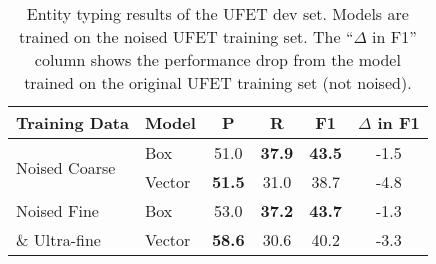 \documentclass[11pt,a4paper]{article}
\begin{document}
\renewcommand{\arraystretch}{1}
\begin{table}[t]
	\centering
	\small
	\setlength{\tabcolsep}{4pt}
	\begin{tabular}{l l c  c  c  c}
		\toprule
		\multicolumn{1}{c}{Training Data} & \multicolumn{1}{c}{Model}& \multicolumn{1}{c}{P} & \multicolumn{1}{c}{R} & \multicolumn{1}{c}{F1}  & \multicolumn{1}{c}{$\Delta$ in F1} \\
		\midrule
		 \multirow{2}{*}{Noised Coarse} & Box & 51.0 & \textbf{37.9} & \textbf{43.5} & -1.5 \\
		 & Vector & \textbf{51.5} & 31.0 & 38.7 & -4.8\\
		 \midrule
		 Noised Fine & Box & 53.0 & \textbf{37.2} & \textbf{43.7} & -1.3 \\
		 \:\:\:\:\& Ultra-fine& Vector & \textbf{58.6} & 30.6 & 40.2 & -3.3\\
		\bottomrule 
	\end{tabular}
	\caption{Entity typing results of the UFET dev set. Models are trained on the noised UFET training set. The ``$\Delta$ in F1'' column shows the performance drop from the model trained on the original UFET training set (not noised).}
	\label{tab:noised_ufet}
	\vspace{-4pt}
\end{table}
\end{document}
